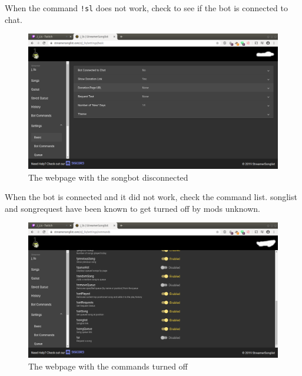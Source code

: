 When the command \lstinline{!sl} does not work, check to see if the bot is connected to chat.
\begin{figure}[ht!]
  \includegraphics[width=\linewidth]{src/troubleshooting_songbot/bot_disconnected.png}
  \caption{The webpage with the songbot disconnected}
  \label{bot disconnected}
\end{figure}
When the bot is connected and it did not work, check the command list. songlist and songrequest have been known to get turned off by mods unknown.
\begin{figure}[ht!]
  \includegraphics[width=\linewidth]{src/troubleshooting_songbot/songlist_commands_off.png}
  \caption{The webpage with the commands turned off}
  \label{commands off}
\end{figure}

\newpage
